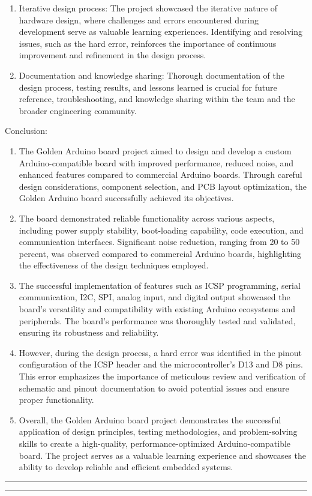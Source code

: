 \documentclass[a4paper,11pt]{article}%
\begin{document}
\begin{enumerate}
	\item Iterative design process: The project showcased the iterative nature of hardware design, where challenges and errors encountered during development serve as valuable learning experiences. Identifying and resolving issues, such as the hard error, reinforces the importance of continuous improvement and refinement in the design process.
	\item Documentation and knowledge sharing: Thorough documentation of the design process, testing results, and lessons learned is crucial for future reference, troubleshooting, and knowledge sharing within the team and the broader engineering community.
\end{enumerate}

Conclusion:

\begin{enumerate}
	\item The Golden Arduino board project aimed to design and develop a custom Arduino-compatible board with improved performance, reduced noise, and enhanced features compared to commercial Arduino boards. Through careful design considerations, component selection, and PCB layout optimization, the Golden Arduino board successfully achieved its objectives.
	\item The board demonstrated reliable functionality across various aspects, including power supply stability, boot-loading capability, code execution, and communication interfaces. Significant noise reduction, ranging from 20 to 50 percent, was observed compared to commercial Arduino boards, highlighting the effectiveness of the design techniques employed.
	\item The successful implementation of features such as ICSP programming, serial communication, I2C, SPI, analog input, and digital output showcased the board's versatility and compatibility with existing Arduino ecosystems and peripherals. The board's performance was thoroughly tested and validated, ensuring its robustness and reliability.
	\item However, during the design process, a hard error was identified in the pinout configuration of the ICSP header and the microcontroller's D13 and D8 pins. This error emphasizes the importance of meticulous review and verification of schematic and pinout documentation to avoid potential issues and ensure proper functionality.
	\item Overall, the Golden Arduino board project demonstrates the successful application of design principles, testing methodologies, and problem-solving skills to create a high-quality, performance-optimized Arduino-compatible board. The project serves as a valuable learning experience and showcases the ability to develop reliable and efficient embedded systems.
\end{enumerate}

\vfill
\hrule
\vspace{0.5cm}



\vspace{1cm}
\hrule
\vspace{0.5cm}


\end{document}
